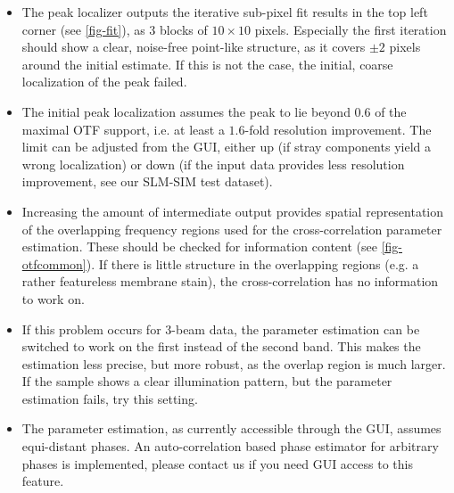 \documentclass[twoside=false,
           twocolumn=false,
           a4paper,DIV=15,
           10pt]{scrartcl}
\begin{document}
\begin{itemize}
\item The peak localizer outputs the iterative sub-pixel
fit results in the top left corner (see \cref{fig-fit}),
as 3 blocks of $10\times10$ pixels. Especially the first
iteration should show a clear, noise-free point-like structure,
as it covers $\pm 2$ pixels around the initial estimate.
If this is not the case, the initial, coarse localization 
of the peak failed.
\item The initial peak localization assumes the peak
to lie beyond $0.6$ of the maximal OTF support, i.e.
at least a $1.6$-fold resolution improvement. The limit can
be adjusted from the GUI, either up 
(if stray components yield a wrong localization)
or down (if the input data provides less resolution improvement,
see our SLM-SIM test dataset).
\item Increasing the amount of intermediate output provides 
spatial representation
of the overlapping frequency regions used for the cross-correlation
parameter estimation. These should be checked for information 
content (see \cref{fig-otfcommon}).
If there is little structure in the overlapping regions (e.g.
a rather featureless membrane stain), 
the cross-correlation has no information to work on.
\item If this problem occurs for 3-beam data, the parameter
estimation can be switched to work on the first instead of
the second band. This makes the estimation less precise,
but more robust, as the overlap region is much larger.
If the sample shows a clear illumination pattern, but the
parameter estimation fails, try this setting.
\item The parameter estimation, as currently accessible through
the GUI, assumes equi-distant phases. An auto-correlation based
phase estimator for arbitrary phases is 
implemented\cite{wicker2013-phase2}, please contact us if you
need GUI access to this feature.
\end{itemize}
\end{document}
